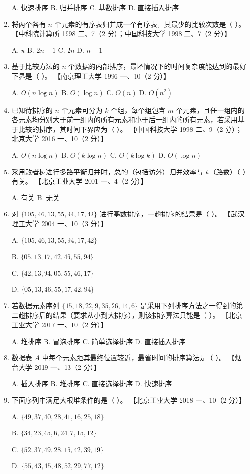 \documentclass[lang=cn,newtx,10pt,scheme=chinese]{elegantbook}
\begin{document}
\begin{enumerate}
    A. 快速排序 \quad B. 归并排序 \quad C. 基数排序 \quad D. 直接插入排序  

    \item 将两个各有 $n$ 个元素的有序表归并成一个有序表，其最少的比较次数是（ ）。  
    【中科院计算所 1998 二、7（2 分）；中国科技大学 1998 二、7（2 分）】  

    A. $n$ \quad B. $2n-1$ \quad C. $2n$ \quad D. $n-1$  

    \item 基于比较方法的 $n$ 个数据的内部排序，最坏情况下的时间复杂度能达到的最好下界是（ ）。  
    【南京理工大学 1996 一、10（2 分）】  

    A. $O(n \log n)$ \quad B. $O(\log n)$ \quad C. $O(n)$ \quad D. $O(n^2)$  

    \item 已知待排序的 $n$ 个元素可分为 $k$ 个组，每个组包含 $m$ 个元素，且任一组内的各元素均分别大于前一组内的所有元素和小于后一组内的所有元素，若采用基于比较的排序，其时间下界应为（ ）。  
    【中国科技大学 1998 二、9（2 分）；北京大学 2016 一、10（2 分）】 

    A. $O(n \log n)$ \quad B. $O(k \log n)$ \quad C. $O(k \log k)$ \quad D. $O(\log n)$  

    \item 采用败者树进行多路平衡归并时，总的（包括访外）归并效率与 $k$（路数）（ ）有关。  
    【北京工业大学 2001 一、4（2 分）】  

    A. 有关 \quad B. 无关  

    \item 对 $\{105, 46, 13, 55, 94, 17, 42\}$ 进行基数排序，一趟排序的结果是（ ）。  
    【武汉理工大学 2004 一、10（3 分）】  

    A. $\{105, 46, 13, 55, 94, 17, 42\}$  

    B. $\{05, 13, 17, 42, 46, 55, 94\}$  

    C. $\{42, 13, 94, 05, 55, 46, 17\}$  

    D. $\{05, 13, 46, 55, 17, 42, 94\}$  

    \item 若数据元素序列 $\{15, 18, 22, 9, 35, 26, 14, 6\}$ 是采用下列排序方法之一得到的第二趟排序后的结果（要求从小到大排序），则该排序算法只能是（ ）。  
    【北京工业大学 2017 一、10（2 分）】  

    A. 堆排序 \quad B. 冒泡排序 \quad C. 简单选择排序 \quad D. 直接插入排序  

    \item 数据表 $A$ 中每个元素距其最终位置较近，最省时间的排序算法是（ ）。  
    【烟台大学 2019 一、13（2 分）】  

    A. 插入排序 \quad B. 堆排序 \quad C. 直接选择排序 \quad D. 快速排序 

    \item 下面序列中满足大根堆条件的是（ ）。  
    【北京工业大学 2018 一、10（2 分）】  

    A. $\{49, 37, 40, 28, 41, 16, 25, 18\}$  

    B. $\{34, 23, 45, 6, 24, 7, 15, 12\}$  

    C. $\{52, 37, 49, 28, 16, 42, 39, 19\}$  

    D. $\{55, 43, 45, 48, 52, 29, 77, 12\}$  
\end{enumerate}
\end{document}

